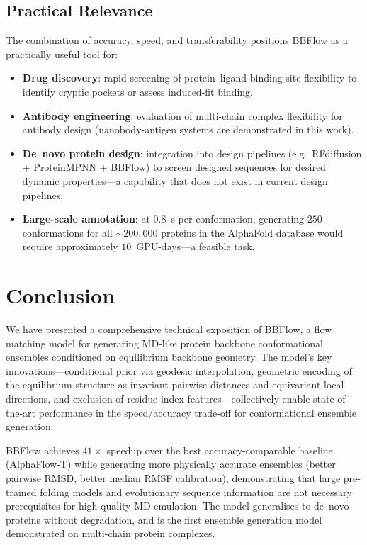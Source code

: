 \documentclass[12pt,a4paper]{article}
\begin{document}
\subsection{Practical Relevance}
\label{sec:practical}

The combination of accuracy, speed, and transferability positions BBFlow as a practically
useful tool for:
\begin{itemize}
  \item \textbf{Drug discovery}: rapid screening of protein--ligand binding-site flexibility
    to identify cryptic pockets or assess induced-fit binding.
  \item \textbf{Antibody engineering}: evaluation of multi-chain complex flexibility for
    antibody design (nanobody-antigen systems are demonstrated in this work).
  \item \textbf{De~novo protein design}: integration into design pipelines (e.g.\
    RFdiffusion + ProteinMPNN + BBFlow) to screen designed sequences for desired
    dynamic properties---a capability that does not exist in current design pipelines.
  \item \textbf{Large-scale annotation}: at $0.8$~s per conformation, generating $250$
    conformations for all $\sim 200{,}000$ proteins in the AlphaFold database would require
    approximately $10$~GPU-days---a feasible task.
\end{itemize}

\section{Conclusion}
\label{sec:conclusion}

We have presented a comprehensive technical exposition of BBFlow, a flow matching model for
generating MD-like protein backbone conformational ensembles conditioned on equilibrium backbone
geometry.  The model's key innovations---conditional prior via geodesic interpolation, geometric
encoding of the equilibrium structure as invariant pairwise distances and equivariant local
directions, and exclusion of residue-index features---collectively enable state-of-the-art
performance in the speed/accuracy trade-off for conformational ensemble generation.

BBFlow achieves $41\times$ speedup over the best accuracy-comparable baseline (AlphaFlow-T)
while generating more physically accurate ensembles (better pairwise RMSD, better median
RMSF calibration), demonstrating that large pre-trained folding models and evolutionary sequence
information are not necessary prerequisites for high-quality MD emulation.  The model
generalises to de~novo proteins without degradation, and is the first ensemble generation
model demonstrated on multi-chain protein complexes.
\end{document}
